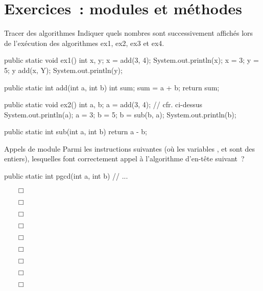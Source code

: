 \clearpage
\section{Exercices~: modules et méthodes}

		\begin{Exercice}{Tracer des algorithmes}
			Indiquer quels nombres sont successivement affichés 
			lors de l’exécution des algorithmes ex1, ex2, ex3 et ex4.

			\begin{java}
public static void ex1(){
	int x, y;
	x = add(3, 4);
	System.out.println(x);
	x = 3;
	y = 5;
	y add(x, Y);
	System.out.println(y);
}

public static int add(int a, int b){
	int sum;
	sum = a + b;
	return sum;
}
			\end{java}

			\begin{java}
public static void ex2(){
	int a, b;
	a = add(3, 4);		// cfr. ci-dessus
	System.out.println(a);
	a = 3;
	b = 5;
	b = sub(b, a);
	System.out.println(b);
}

public static int sub(int a, int b){
	return a - b;
}
			\end{java}

	\end{Exercice}

	\begin{Exercice}{Appels de module}
		Parmi les instructions suivantes (où les variables
		,  et 
		sont des entiers), lesquelles font correctement appel 
		à l’algorithme d’en-tête suivant~?

		\begin{java}
public static int pgcd(int a, int b){
	// ...
}
		\end{java}

		\begin{itemize}
			\item[$\Box$]  
			\item[$\Box$] 
			\item[$\Box$] 
			\item[$\Box$] 
			\item[$\Box$] 
			\item[$\Box$] 
			\item[$\Box$] 
			\item[$\Box$] 
			\item[$\Box$] 
		\end{itemize}

	\end{Exercice}

